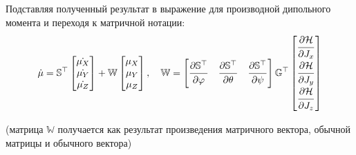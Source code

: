 Подставляя полученный результат в выражение для производной дипольного момента и переходя к матричной нотации:
\begin{gather}
	\dot{\mu} = \mathbb{S}^\top
	\begin{bmatrix}
		\dot{\mu_X} \\
		\dot{\mu_Y} \\
		\dot{\mu_Z}
	\end{bmatrix} +
        \mathbb{W}
	\begin{bmatrix}
		\mu_X \\
		\mu_Y \\
		\mu_Z
	\end{bmatrix}, 
	\quad 
	\mathbb{W} = 
	\begin{bmatrix}
		\dfrac{\strut\partial \mathbb{S}^\top}{\strut\partial \varphi} &
		\dfrac{\strut\partial \mathbb{S}^\top}{\strut\partial \theta} &
		\dfrac{\strut\partial \mathbb{S}^\top}{\strut\partial \psi}
	\end{bmatrix}
	\mathbb{G}^\top
	\begin{bmatrix}
		\dfrac{\strut\partial \mathcal{H}}{\strut\partial J_x} \\
		\dfrac{\strut\partial \mathcal{H}}{\strut\partial J_y} \\
		\dfrac{\strut\partial \mathcal{H}}{\strut\partial J_z}
	\end{bmatrix} \notag
\end{gather}

(матрица $\mathbb{W}$ получается как результат произведения матричного вектора, обычной матрицы и обычного вектора)


